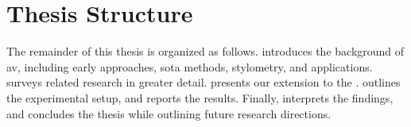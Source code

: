 \section{Thesis Structure}
\label{sec:thesis_structure}

The remainder of this thesis is organized as follows. 
 introduces the background of \ac{av}, including early approaches, \acl{sota} methods, stylometry, and applications. 
 surveys related research in greater detail. 
 presents our extension to the \impAppr{}. 
 outlines the experimental setup, and  reports the results. 
Finally,  interprets the findings, and  concludes the thesis while outlining future research directions. 
